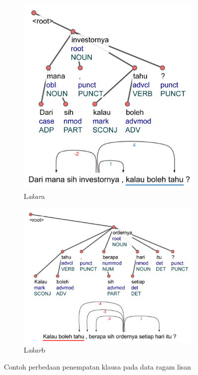 \begin{figure}
\centering

\begin{subfigure}{.4\linewidth}
  \centering
  \includegraphics[width=1\linewidth] {pics/ls1436.jpg} 
	\caption{L\textit{akar}a}
	\label{fig:ls1436} 
\end{subfigure}
%
\begin{subfigure}{.58\linewidth}
  \centering
  \includegraphics[width=1\linewidth]{pics/ls1460.jpg} 
	\caption{L\textit{akar}b}
	\label{fig:ls1460} 
\end{subfigure}

\caption{Contoh perbedaan penempatan klausa pada data ragam lisan}
\label{fig:akarcontoh}
\end{figure}

